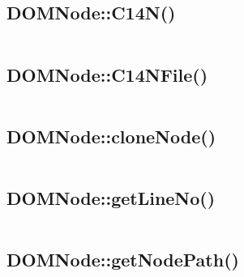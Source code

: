 \begin{lstlisting}[language=PHP]

\end{lstlisting}

\subsection{DOMNode::C14N()}



\begin{lstlisting}[language=PHP]

\end{lstlisting}

\subsection{DOMNode::C14NFile()}



\begin{lstlisting}[language=PHP]

\end{lstlisting}


\subsection{DOMNode::cloneNode()}



\begin{lstlisting}[language=PHP]

\end{lstlisting}



\subsection{DOMNode::getLineNo()}


\begin{lstlisting}[language=PHP]

\end{lstlisting}



\subsection{DOMNode::getNodePath()}


\begin{lstlisting}[language=PHP]

\end{lstlisting}



